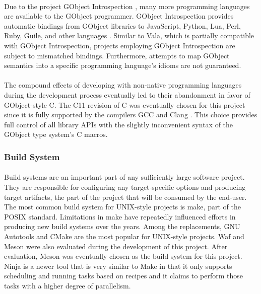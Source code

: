 \paragraph{}
Due to the project GObject Introspection \cite{gobject-introspection}, many more programming languages are available to the GObject programmer.
GObject Introspection provides automatic bindings from GObject libraries to JavaScript, Python, Lua, Perl, Ruby, Guile, and other languages \cite{gi-users}.
Similar to Vala, which is partially compatible with GObject Introspection, projects employing GObject Introspection are subject to mismatched bindings.
Furthermore, attempts to map GObject semantics into a specific programming language's idioms are not guaranteed.

\paragraph{}
The compound effects of developing with non-native programming languages during the development process eventually led to their abandonment in favor of GObject-style C.
The C11 revision of C was eventually chosen for this project since it is fully supported by the compilers GCC \cite{gcc-c11-compatibility} and Clang \cite{clang-c11-compatibility}.
This choice provides full control of all library APIs with the slightly inconvenient syntax of the GObject type system's C macros.

\subsubsection{Build System}

\paragraph{}
Build systems are an important part of any sufficiently large software project.
They are responsible for configuring any target-specific options and producing target artifacts, the part of the project that will be consumed by the end-user.
The most common build system for UNIX-style projects is make, part of the POSIX standard.
Limitations in make have repeatedly influenced efforts in producing new build systems over the years.
Among the replacements, GNU Autotools and CMake are the most popular for UNIX-style projects.
Waf and Meson were also evaluated during the development of this project.
After evaluation, Meson was eventually chosen as the build system for this project.
Ninja is a newer tool that is very similar to Make in that it only supports scheduling and running tasks based on recipes and it claims to perform those tasks with a higher degree of parallelism.

